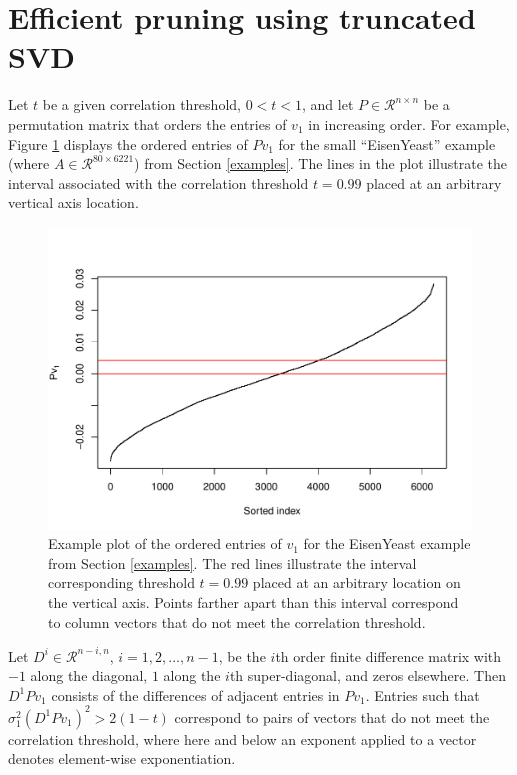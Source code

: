 \documentclass{article}
\numberwithin{algorithmctr}{section}
\begin{document}
\section{Efficient pruning using truncated SVD}

Let $t$ be a given correlation threshold, $0<t<1$, and let
$P\in\mathcal{R}^{n\times n}$ be a permutation matrix that orders the entries
of $v_1$ in increasing order.  For example, Figure \ref{fig1} displays the
ordered entries of $Pv_1$ for the small ``EisenYeast'' example (where
$A\in\mathcal{R}^{80 \times 6221}$) from Section \ref{examples}.  The lines in
the plot illustrate the interval associated with the correlation threshold
$t=0.99$ placed at an arbitrary vertical axis location.

\begin{figure}[!ht]
\begin{center}
\includegraphics{draft-001}
\caption{
Example plot of the ordered entries of $v_1$ for the EisenYeast example from
Section \ref{examples}. The red lines illustrate the interval corresponding
threshold $t=0.99$ placed at an arbitrary location on the vertical axis. Points
farther apart than this interval correspond to column vectors that do not meet
the correlation threshold.
\label{fig1}
}
\end{center}
\end{figure}

Let $D^i\in\mathcal{R}^{n-i, n}$, $i=1,2,\ldots,n-1$, be the $i$th order finite
difference matrix with $-1$ along the diagonal, $1$ along the $i$th
super-diagonal, and zeros elsewhere.  Then $D^1P v_1$ consists of the
differences of adjacent entries in $P v_1$.  Entries such that $\sigma_1^2 (D^1
P v_1)^2 > 2(1-t)$ correspond to pairs of vectors that do not meet the
correlation threshold, where here and below an exponent applied to a vector
denotes element-wise exponentiation.
\end{document}
